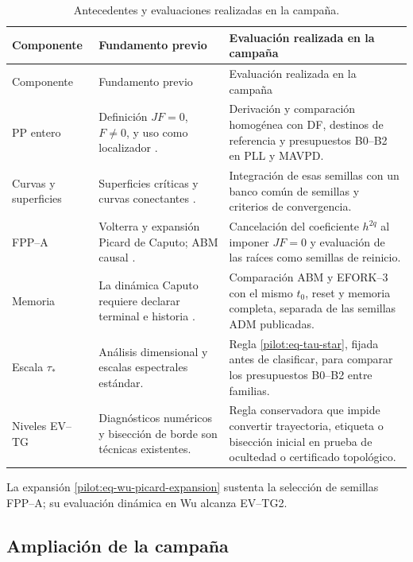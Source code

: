 \begin{longtable}{@{}L{3.2cm}L{4.1cm}L{5.8cm}@{}}
\caption{Antecedentes y evaluaciones realizadas en la campaña.}
\label{pilot:tab-novelty}\\
\toprule
Componente & Fundamento previo & Evaluación realizada en la campaña\\
\midrule
\endfirsthead
\toprule
Componente & Fundamento previo & Evaluación realizada en la campaña\\
\midrule
\endhead
PP entero & Definición $JF=0$, $F\ne0$, y uso como localizador
\cite{Prasad2015Perpetual,DudkowskiPrasadKapitaniak2017,
DudkowskiPrasadKapitaniak2018}. & Derivación y comparación homogénea con DF,
destinos de referencia y presupuestos B0--B2 en PLL y MAVPD.\\
Curvas y superficies & Superficies críticas y curvas conectantes
\cite{GilmoreEtAl2010Connecting,GuanXie2021Connecting}. & Integración de esas
semillas con un banco común de semillas y criterios de convergencia.\\
FPP--A & Volterra y expansión Picard de Caputo; ABM causal
\cite{DiethelmFordFreed2002}. & Cancelación del coeficiente $h^{2q}$ al imponer $JF=0$ y evaluación de las
raíces como semillas de reinicio.\\
Memoria & La dinámica Caputo requiere declarar terminal e historia
\cite{CongTuan2017Nonlocal,DoanKloeden2021Semidynamical}. & Comparación ABM y
EFORK--3 con el mismo $t_0$, reset y memoria completa, separada de las semillas
ADM publicadas.\\
Escala $\tau_*$ & Análisis dimensional y escalas espectrales estándar. & Regla
\eqref{pilot:eq-tau-star}, fijada antes de clasificar, para comparar los
presupuestos B0--B2 entre familias.\\
Niveles EV--TG & Diagnósticos numéricos y bisección de borde son técnicas
existentes. & Regla conservadora que impide convertir trayectoria, etiqueta o
bisección inicial en prueba de ocultedad o certificado topológico.\\
\bottomrule
\end{longtable}

La expansión \eqref{pilot:eq-wu-picard-expansion} sustenta la selección de
semillas FPP--A; su evaluación dinámica en Wu alcanza EV--TG2.

\subsection{Ampliación de la campaña}

